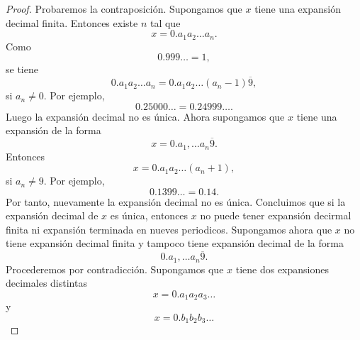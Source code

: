 \documentclass[12pt,a4paper]{article}
\begin{document}
    \begin{proof}
        Probaremos la contraposición. Supongamos que $x$ tiene una expansión decimal finita.
        Entonces existe $n$ tal que
        \begin{equation*}
            x=0.a_{1}a_{2}\dots a_{n}.
        \end{equation*}
        Como
        \begin{equation*}
            0.999\dots=1,
        \end{equation*}
        se tiene
        \begin{equation*}
            0.a_{1}a_{2}\dots a_{n}=0.a_{1}a_{2}\dots(a_{n}-1)\overline{9},
        \end{equation*}
        si $a_{n}\neq0$. Por ejemplo,
        \begin{equation*}
            0.25000\dots=0.24999\dots.
        \end{equation*}
        Luego la expansión decimal no es única. Ahora supongamos que $x$ tiene una expansión
        de la forma
        \begin{equation*}
            x=0.a_{1},\dots a_{n}\overline{9}.
        \end{equation*}
        Entonces
        \begin{equation*}
            x=0.a_{1}a_{2}\dots(a_{n}+1),
        \end{equation*}
        si $a_{n}\neq9$. Por ejemplo,
        \begin{equation*}
            0.1399\dots=0.14.
        \end{equation*}
        Por tanto, nuevamente la expansión decimal no es única. Concluimos que si la expansión
        decimal de $x$ es única, entonces $x$ no puede tener expansión decirmal finita ni expansión
        terminada en nueves periodicos. Supongamos ahora que $x$ no tiene expansión decimal finita
        y tampoco tiene expansión decimal de la forma
        \begin{equation*}
            0.a_{1},\dots a_{n}\overline{9}.
        \end{equation*}
        Procederemos por contradicción. Supongamos que $x$ tiene dos expansiones decimales distintas
        \begin{equation*}
            x=0.a_{1}a_{2}a_{3}\dots
        \end{equation*}
        y 
        \begin{equation*}
            x=0.b_{1}b_{2}b_{3}\dots
        \end{equation*}

\end{proof}
\end{document}
